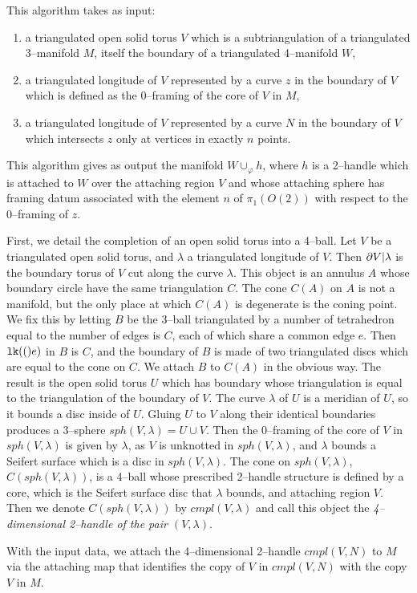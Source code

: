This algorithm takes as input:
\begin{enumerate}
  \item a triangulated open solid torus $V$ which is a subtriangulation of a triangulated 3--manifold $M$, itself the boundary of a triangulated 4--manifold $W$,
  \item a triangulated longitude of $V$ represented by a curve $z$ in the boundary of $V$ which is defined as the 0--framing of the core of $V$ in $M$,
  \item a triangulated longitude of $V$ represented by a curve $N$ in the boundary of $V$ which intersects $z$ only at vertices in exactly $n$ points.
\end{enumerate}
This algorithm gives as output the manifold $W\cup_\varphi h$, where $h$ is a 2--handle which is attached to $W$ over the attaching region $V$ and whose attaching sphere has framing datum associated with the element $n$ of $\pi_1(O(2))$ with respect to the 0--framing of $z$.

First, we detail the completion of an open solid torus into a 4--ball.
Let $V$ be a triangulated open solid torus, and $\lambda$ a triangulated longitude of $V$.
Then $\partial V |\lambda$ is the boundary torus of $V$ cut along the curve $\lambda$.
This object is an annulus $A$ whose boundary circle have the same triangulation $C$.
The cone $C(A)$ on $A$ is not a manifold, but the only place at which $C(A)$ is degenerate is the coning point.
We fix this by letting $B$ be the 3--ball triangulated by a number of tetrahedron equal to the number of edges is $C$, each of which share a common edge $e$.
Then $\texttt{lk}(()e)$ in $B$ is $C$, and the boundary of $B$ is made of two triangulated discs which are equal to the cone on $C$.
We attach $B$ to $C(A)$ in the obvious way.
The result is the open solid torus $U$ which has boundary whose triangulation is equal to the triangulation of the boundary of $V$.
The curve $\lambda$ of $U$ is a meridian of $U$, so it bounds a disc inside of $U$.
Gluing $U$ to $V$ along their identical boundaries produces a 3--sphere $sph(V,\lambda)=U\cup V$.
Then the 0--framing of the core of $V$ in $sph(V,\lambda)$ is given by $\lambda$, as $V$ is unknotted in $sph(V,\lambda)$, and $\lambda$ bounds a Seifert surface which is a disc in $sph(V,\lambda)$.
The cone on $sph(V,\lambda)$, $C(sph(V,\lambda))$, is a 4--ball whose prescribed 2--handle structure is defined by a core, which is the Seifert surface disc that $\lambda$ bounds, and attaching region $V$.
Then we denote $C(sph(V,\lambda))$ by $cmpl(V,\lambda)$ and call this object the \emph{4--dimensional 2--handle of the pair $(V,\lambda)$}.

With the input data, we attach the 4--dimensional 2--handle $cmpl(V,N)$ to $M$ via the attaching map that identifies the copy of $V$ in $cmpl(V,N)$ with the copy $V$ in $M$.
